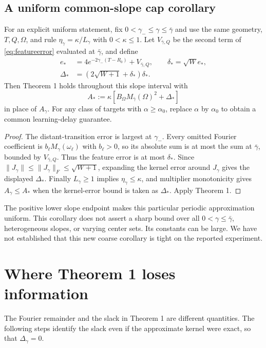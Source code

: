 \documentclass[11pt]{article}
\theoremstyle{definition}
\begin{document}
\subsection*{A uniform common-slope cap corollary}
For an explicit uniform statement, fix $0<\gamma_-\le\gamma\le\bar\gamma$
and use the same geometry, $T,Q,\Omega$, and rule
$\eta_\gamma=\kappa/L_\gamma$ with $0<\kappa\le1$.
Let $V_{\bar\gamma,Q}$ be the second term of \eqref{eq:featureerror}
evaluated at $\bar\gamma$, and define
\begin{equation*}
 \begin{split}
 e_*&=4e^{-2\gamma_-(T-R_0)}+V_{\bar\gamma,Q},\qquad\delta_*=\sqrt W e_*,\\
 \Delta_*&=(2\sqrt{W+1}+\delta_*)\delta_*.
 \end{split}
\end{equation*}
Then Theorem 1 holds throughout this slope interval with
\begin{equation*}
 A_*:=\kappa[B_\Omega M_{\bar\gamma}(\Omega)^2+\Delta_*]
\end{equation*}
in place of $A_\gamma$. For any class of targets with $\alpha\ge\alpha_0$,
replace $\alpha$ by $\alpha_0$ to obtain a common learning-delay guarantee.
\begin{proof}
The distant-transition error is largest at $\gamma_-$. Every omitted Fourier
coefficient is $b_\ell M_\gamma(\omega_\ell)$ with $b_\ell>0$, so its
absolute sum is at most the sum at $\bar\gamma$, bounded by
$V_{\bar\gamma,Q}$. Thus the feature error is at most $\delta_*$.
Since $\|J_\gamma\|\le\|J_\gamma\|_F\le\sqrt{W+1}$, expanding the kernel
error around $J_\gamma$ gives the displayed $\Delta_*$. Finally
$L_\gamma\ge1$ implies $\eta_\gamma\le\kappa$, and multiplier monotonicity
gives $A_\gamma\le A_*$ when the kernel-error bound is taken as $\Delta_*$.
Apply Theorem 1.
\end{proof}
The positive lower slope endpoint makes this particular periodic approximation
uniform. This corollary does not assert a sharp bound over all
$0<\gamma\le\bar\gamma$, heterogeneous slopes, or varying center sets.
Its constants can be large. We have not established that this new coarse
corollary is tight on the reported experiment.

\section{Where Theorem 1 loses information}
The Fourier remainder and the slack in Theorem 1 are different quantities.
The following steps identify the slack even if the approximate kernel were
exact, so that $\Delta_\gamma=0$.
\end{document}
